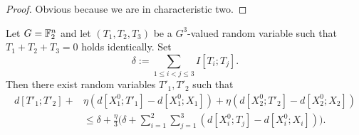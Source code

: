 \begin{proof} \leanok Obvious because we are in characteristic two.
\end{proof}

\begin{lemma}\label{construct-good}
  \leanok
  Let $G=\mathbb{F}_2^n$ and let $(T_1,T_2,T_3)$ be a $G^3$-valued random variable such that $T_1+T_2+T_3=0$ holds identically. Set
  \begin{equation}\label{delta-t1t2t3-def}
    \delta := \sum_{1 \leq i < j \leq 3} I[T_i;T_j].
  \end{equation}
  Then there exist random variables $T'_1, T'_2$ such that
  \begin{align*}  d[T'_1;T'_2] + & \eta (d[X_1^0;T'_1] - d[X_1^0;X_1]) + \eta(d[X_2^0;T'_2] - d[X_2^0;X_2]) \\ & \leq  \delta + \frac{\eta}{3} \biggl( \delta + \sum_{i=1}^2 \sum_{j = 1}^3 (d[X^0_i;T_j] - d[X^0_i; X_i]) \biggr).
  \end{align*}
\end{lemma}

